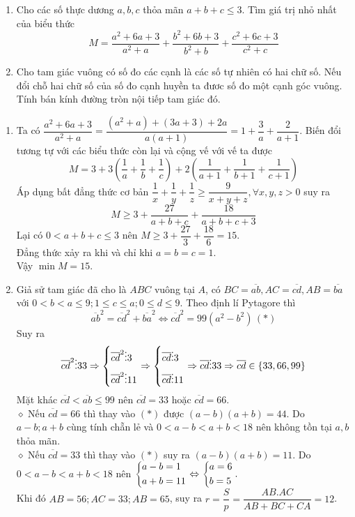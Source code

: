 \begin{ex}%
\hfill
    \begin{enumerate}
        \item Cho các số thực dương $a,b,c$ thỏa mãn $a+b+c\le 3$. Tìm giá trị nhỏ nhất của biểu thức
        	$$M=\dfrac{a^2+6a+3}{a^2+a}+\dfrac{b^2+6b+3}{b^2+b}+\dfrac{c^2+6c+3}{c^2+c}$$
        \item Cho tam giác vuông có số đo các cạnh là các số tự nhiên có hai chữ số. Nếu đổi chỗ hai chữ số của số đo cạnh huyền ta đươc số đo một cạnh góc vuông. Tính bán kính đường tròn nội tiếp tam giác đó.
    \end{enumerate}
\loigiai
    {
    \begin{enumerate}
        \item Ta có $\dfrac{a^2+6a+3}{a^2+a}=\dfrac{(a^2+a)+(3a+3)+2a}{a(a+1)}=1+\dfrac{3}{a}+\dfrac{2}{a+1}$. Biến đổi tương tự với các biểu thức còn lại và cộng vế với vế ta được
        $$M=3+3\left(\dfrac{1}{a}+\dfrac{1}{b}+\dfrac{1}{c}\right)+2\left(\dfrac{1}{a+1}+\dfrac{1}{b+1}+\dfrac{1}{c+1}\right)$$
        Áp dụng bất đẳng thức cơ bản $\dfrac{1}{x}+\dfrac{1}{y}+\dfrac{1}{z}\ge \dfrac{9}{x+y+z}, \forall x,y,z>0$ suy ra
        $$M\geq 3+\dfrac{27}{a+b+c}+\dfrac{18}{a+b+c+3}$$
        Lại có $0<a+b+c \le 3$ nên $M\geq 3+\dfrac{27}{3}+\dfrac{18}{6}=15$.\\
        Đẳng thức xảy ra khi và chỉ khi $a=b=c=1$. \\
        Vậy $\displaystyle \min M=15$.
        
        \item Giả sử tam giác đã cho là $ABC$ vuông tại $A$, có $BC=\overline{ab}, AC=\overline{cd}, AB=\overline{ba}$ với $0<b<a\le 9; 1\le c\le a;0\le d \le 9.$ Theo định lí Pytagore thì 
        $$\overline{ab}^2=\overline{cd}^2+\overline{ba}^2 \Leftrightarrow \overline{cd}^2=99(a^2-b^2) \,(*)$$
        Suy ra
        $$\overline{cd}^2\vdots 33 \Rightarrow \left\{\begin{aligned}&\overline{cd}^2\vdots 3\\&\overline{cd}^2\vdots 11\end{aligned}\right.\Rightarrow \left\{\begin{aligned}&\overline{cd}\vdots 3\\&\overline{cd}\vdots 11\end{aligned}\right.\Rightarrow \overline{cd}\vdots 33 \Rightarrow \overline{cd} \in \{33,66,99\}$$
        Mặt khác $\overline{cd}<\overline{ab}\le 99$ nên $\overline{cd}=33$ hoặc $\overline{cd}=66$.\\
        $\diamond$ Nếu $\overline{cd}=66$ thì thay vào $(*)$ được $(a-b)(a+b)=44$. Do $a-b;a+b$ cùng tính chẵn lẻ và $0<a-b<a+b<18$ nên không tồn tại $a,b$ thỏa mãn.\\
        $\diamond$ Nếu $\overline{cd}=33$ thì thay vào $(*)$ suy ra $(a-b)(a+b)=11$. Do $0<a-b<a+b<18$ nên $\left\{\begin{aligned}&a-b=1\\&a+b=11\end{aligned}\right. \Leftrightarrow \left\{\begin{aligned}&a=6\\&b=5\end{aligned}\right..$\\
        Khi đó $AB=56;AC=33;AB=65$, suy ra $r=\dfrac{S}{p}=\dfrac{AB.AC}{AB+BC+CA}=12$.
        
    \end{enumerate}
    }
\end{ex}

